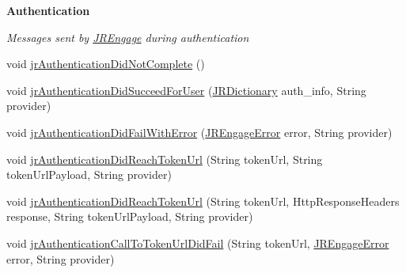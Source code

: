 \begin{Indent}{\bf Authentication}\par
{\em \label{_amgrpc75f7811d70d17dbcd88e9d03752cbed}
 Messages sent by \hyperlink{classcom_1_1janrain_1_1android_1_1engage_1_1_j_r_engage}{JREngage} during authentication }\begin{DoxyCompactItemize}
\item 
void \hyperlink{interfacecom_1_1janrain_1_1android_1_1engage_1_1_j_r_engage_delegate_a388f6ea1d314132c85a215c952fb7901}{jrAuthenticationDidNotComplete} ()
\item 
void \hyperlink{interfacecom_1_1janrain_1_1android_1_1engage_1_1_j_r_engage_delegate_a589d849b42af1061bac4697ab9982bba}{jrAuthenticationDidSucceedForUser} (\hyperlink{classcom_1_1janrain_1_1android_1_1engage_1_1types_1_1_j_r_dictionary}{JRDictionary} auth\_\-info, String provider)
\item 
void \hyperlink{interfacecom_1_1janrain_1_1android_1_1engage_1_1_j_r_engage_delegate_a35444c1f8c0fec9d14274e9a615cba0a}{jrAuthenticationDidFailWithError} (\hyperlink{classcom_1_1janrain_1_1android_1_1engage_1_1_j_r_engage_error}{JREngageError} error, String provider)
\item 
void \hyperlink{interfacecom_1_1janrain_1_1android_1_1engage_1_1_j_r_engage_delegate_af21770beedd9b06b9b4c07549c9c7619}{jrAuthenticationDidReachTokenUrl} (String tokenUrl, String tokenUrlPayload, String provider)
\item 
void \hyperlink{interfacecom_1_1janrain_1_1android_1_1engage_1_1_j_r_engage_delegate_a4b00beabacace5dd67a7bc60f133dcb4}{jrAuthenticationDidReachTokenUrl} (String tokenUrl, HttpResponseHeaders response, String tokenUrlPayload, String provider)
\item 
void \hyperlink{interfacecom_1_1janrain_1_1android_1_1engage_1_1_j_r_engage_delegate_a424d0bbf6dd2dbfe81a382406e5ac5ad}{jrAuthenticationCallToTokenUrlDidFail} (String tokenUrl, \hyperlink{classcom_1_1janrain_1_1android_1_1engage_1_1_j_r_engage_error}{JREngageError} error, String provider)
\end{DoxyCompactItemize}
\end{Indent}
